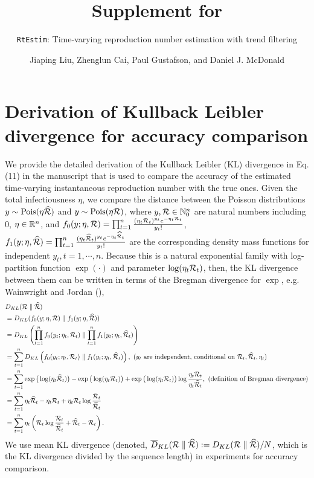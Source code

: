 \documentclass[
]{article}
\title{Supplement for}
\subtitle{\texttt{RtEstim}: Time-varying reproduction number estimation with trend filtering}
\author{Jiaping Liu, Zhenglun Cai, Paul Gustafson, and Daniel J. McDonald}
\date{}
\begin{document}
\maketitle

{
\setcounter{tocdepth}{2}
\tableofcontents
}
\section{Derivation of Kullback Leibler divergence for accuracy comparison}\label{derivation-of-kullback-leibler-divergence-for-accuracy-comparison}

We provide the detailed derivation of the Kullback Leibler (KL) divergence in
Eq. (11) in the manuscript that is used to compare the accuracy of the estimated
time-varying instantaneous reproduction number with the true ones. Given the
total infectiousness \(\eta\), we compare the distance between the Poisson
distributions \(y\sim \textrm{Pois}(\eta \widehat{\mathcal{R}})\) and \(y\sim \textrm{Pois}(\eta \mathcal{R})\),
where \(y,\mathcal{R}\in\mathbb{N}_0^n\) are natural numbers including 0, \(\eta\in\mathbb{R}^n\),
and \(f_0(y;\eta,\mathcal{R}) = \prod_{t=1}^n \frac{(\eta_t\mathcal{R}_t)^{y_t} e^{-\eta_t\mathcal{R}_t}}{y_t!}\),
\(f_1(y;\eta,\widehat{\mathcal{R}}) = \prod_{t=1}^n \frac{(\eta_t\widehat{\mathcal{R}}_t)^{y_t} e^{-\eta_t\widehat{\mathcal{R}}_t}}{y_t!}\) are the corresponding density mass functions
for independent \(y_t,t=1,\cdots,n\). Because this is a natural exponential family
with log-partition function \(\exp(\cdot)\) and parameter \(\log(\eta_t\mathcal{R}_t)\),
then, the KL divergence between them can be written in terms of the Bregman
divergence for \(\exp\), e.g. Wainwright and Jordan (),
\begin{align*}
    &D_{KL}(\mathcal{R} \parallel \widehat{\mathcal{R}})\\ 
    &= D_{KL}(f_0(y;\eta,\mathcal{R}) \parallel f_1(y;\eta,\widehat{\mathcal{R}})) \\
    &= D_{KL}\left(\prod_{t=1}^n f_0(y_t;\eta_t,\mathcal{R}_t) \parallel \prod_{t=1}^n f_1(y_t;\eta_t,\widehat{\mathcal{R}}_t)\right)\\
    &= \sum_{t=1}^n D_{KL}\left(f_0(y_t;\eta_t,\mathcal{R}_t) \parallel f_1(y_t;\eta_t,\widehat{\mathcal{R}}_t)\right),\text{ ($y_t$ are independent, conditional on $\mathcal{R}_t,\widehat{\mathcal{R}}_t,\eta_t$)}\\
    &= \sum_{t=1}^n \exp\big(\log(\eta_t\widehat{\mathcal{R}}_t)\big) - \exp\big(\log(\eta_t\mathcal{R}_t)\big) + \exp\big(\log(\eta_t\mathcal{R}_t)\big)\log\frac{\eta_t\mathcal{R}_t}{\eta_t\widehat{\mathcal{R}}_t}, \text{ (definition of Bregman divergence)} \\
    &= \sum_{t=1}^n \eta_t\widehat{\mathcal{R}}_t - \eta_t\mathcal{R}_t + \eta_t\mathcal{R}_t \log\frac{\mathcal{R}_t}{\widehat{\mathcal{R}}_t}\\
    &= \sum_{t=1}^n \eta_t\left(\mathcal{R}_t \log\frac{\mathcal{R}_t}{\widehat{\mathcal{R}}_t} + \widehat{\mathcal{R}}_t - \mathcal{R}_t\right).\\
\end{align*}
We use mean KL divergence (denoted,
\(\overline{D}_{KL}(\mathcal{R} \parallel \widehat{\mathcal{R}}) := D_{KL}(\mathcal{R} \parallel \widehat{\mathcal{R}}) / N\),
which is the KL divergence divided by the sequence length) in experiments for
accuracy comparison.
\end{document}
